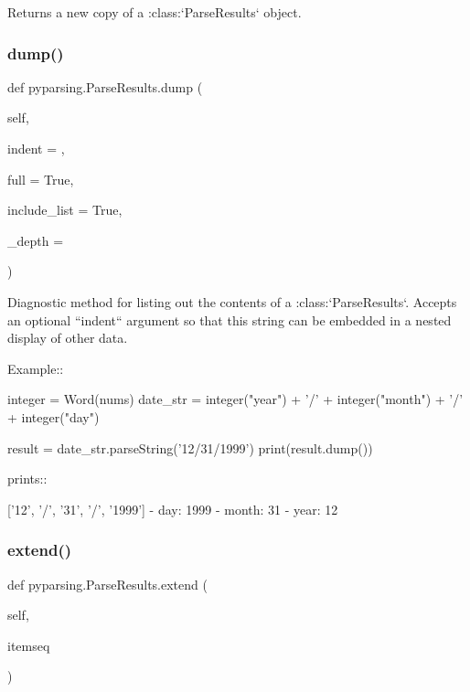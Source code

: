 \begin{DoxyVerb}Returns a new copy of a :class:`ParseResults` object.
\end{DoxyVerb}
 \mbox{\label{classpyparsing_1_1ParseResults_abe6f1c3c8271ce11c6098f7564920327}} 
\subsubsection{\texorpdfstring{dump()}{dump()}}
{\footnotesize\ttfamily def pyparsing.\+Parse\+Results.\+dump (\begin{DoxyParamCaption}\item[{}]{self,  }\item[{}]{indent = {\ttfamily \textquotesingle{}\textquotesingle{}},  }\item[{}]{full = {\ttfamily True},  }\item[{}]{include\+\_\+list = {\ttfamily True},  }\item[{}]{\+\_\+depth = {} }\end{DoxyParamCaption})}

\begin{DoxyVerb}Diagnostic method for listing out the contents of
a :class:`ParseResults`. Accepts an optional ``indent`` argument so
that this string can be embedded in a nested display of other data.

Example::

    integer = Word(nums)
    date_str = integer("year") + '/' + integer("month") + '/' + integer("day")

    result = date_str.parseString('12/31/1999')
    print(result.dump())

prints::

    ['12', '/', '31', '/', '1999']
    - day: 1999
    - month: 31
    - year: 12
\end{DoxyVerb}
 \mbox{\label{classpyparsing_1_1ParseResults_a7cbd1685eda7882326fe0612e73064e6}} 
\subsubsection{\texorpdfstring{extend()}{extend()}}
{\footnotesize\ttfamily def pyparsing.\+Parse\+Results.\+extend (\begin{DoxyParamCaption}\item[{}]{self,  }\item[{}]{itemseq }\end{DoxyParamCaption})}

